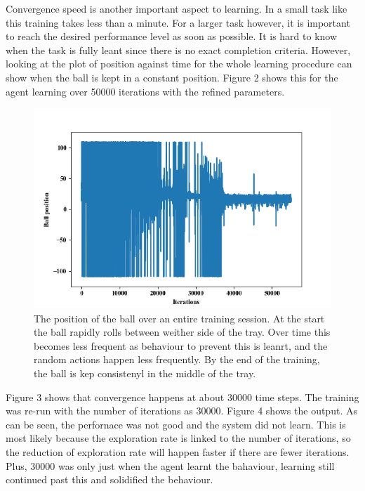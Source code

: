 \documentclass[12pt,a4paper]{article}
\begin{document}
Convergence speed is another important aspect to learning. In a small task like this training takes less than a minute. For a larger task however, it is important to reach the desired performance level as soon as possible. It is hard to know when the task is fully leant since there is no exact completion criteria. However, looking at the plot of position against time for the whole learning procedure can show when the ball is kept in a constant position. Figure 2 shows this for the agent learning over 50000 iterations with the refined parameters.
\begin{figure}[H]
	\includegraphics{153_small}
	\caption{The position of the ball over an entire training session. At the start the ball rapidly rolls between weither side of the tray. Over time this becomes less frequent as behaviour to prevent this is leanrt, and the random actions happen less frequently. By the end of the training, the ball is kep consistenyl in the middle of the tray.}
\end{figure}
Figure 3 shows that convergence happens at about 30000 time steps. The training was re-run with the number of iterations as 30000. Figure 4 shows the output. As can be seen, the perfornace was not good and the system did not learn. This is most likely because the exploration rate is linked to the number of iterations, so the reduction of exploration rate will happen faster if there are fewer iterations. Plus, 30000 was only just when the agent learnt the bahaviour, learning still continued past this and solidified the behaviour.
\end{document}
